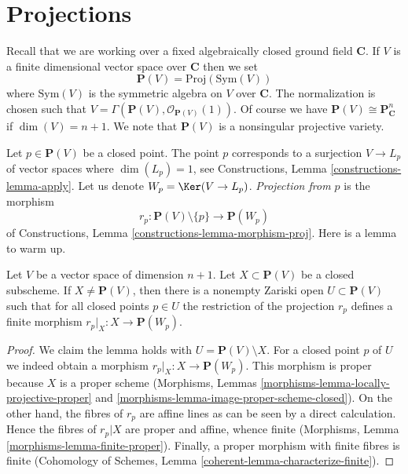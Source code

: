 \section{Projections}
\label{section-projection}

\noindent
Recall that we are working over a fixed algebraically closed ground field
$\mathbf{C}$. If $V$ is a finite dimensional vector space over $\mathbf{C}$
then we set
$$
\mathbf{P}(V) = \text{Proj}(\text{Sym}(V))
$$
where $\text{Sym}(V)$ is the symmetric algebra on $V$ over $\mathbf{C}$.
The normalization is chosen such that
$V = \Gamma(\mathbf{P}(V), \mathcal{O}_{\mathbf{P}(V)}(1))$.
Of course we have $\mathbf{P}(V) \cong \mathbf{P}^n_{\mathbf{C}}$ if
$\dim(V) = n + 1$. We note that $\mathbf{P}(V)$ is a nonsingular projective
variety.

\medskip\noindent
Let $p \in \mathbf{P}(V)$ be a closed point. The point $p$ corresponds to a
surjection $V \to L_p$ of vector spaces where $\dim(L_p) = 1$, see
Constructions, Lemma \ref{constructions-lemma-apply}.
Let us denote $W_p = \Ker(V \to L_p)$.
{\it Projection from $p$} is the morphism
$$
r_p : \mathbf{P}(V) \setminus \{p\} \longrightarrow \mathbf{P}(W_p)
$$
of Constructions, Lemma \ref{constructions-lemma-morphism-proj}.
Here is a lemma to warm up.

\begin{lemma}
\label{lemma-projection-generically-finite}
Let $V$ be a vector space of dimension $n + 1$.
Let $X \subset \mathbf{P}(V)$ be a closed subscheme.
If $X \not = \mathbf{P}(V)$, then there is a nonempty Zariski open
$U \subset \mathbf{P}(V)$
such that for all closed points $p \in U$ the restriction
of the projection $r_p$ defines a finite morphism
$r_p|_X : X \to \mathbf{P}(W_p)$.
\end{lemma}

\begin{proof}
We claim the lemma holds with $U = \mathbf{P}(V) \setminus X$. For a closed
point $p$ of $U$ we indeed obtain a morphism $r_p|_X : X \to \mathbf{P}(W_p)$.
This morphism is proper because $X$ is a proper scheme
(Morphisms, Lemmas \ref{morphisms-lemma-locally-projective-proper} and
\ref{morphisms-lemma-image-proper-scheme-closed}). On the other hand, the
fibres of $r_p$ are affine lines as can be seen by a direct calculation.
Hence the fibres of $r_p|X$ are proper and affine, whence finite
(Morphisms, Lemma \ref{morphisms-lemma-finite-proper}).
Finally, a proper morphism with finite fibres is finite
(Cohomology of Schemes, Lemma \ref{coherent-lemma-characterize-finite}).
\end{proof}

